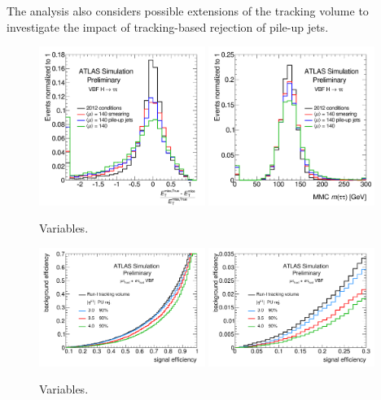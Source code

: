The analysis also considers possible extensions of the tracking volume to investigate the impact of tracking-based rejection of pile-up jets. 

\begin{figure}[!htpb]
  \centering
  \includegraphics[width=0.48\textwidth]{figures/ATL-PHYS-PUB-2014-018/fig_01a}
  \includegraphics[width=0.48\textwidth]{figures/ATL-PHYS-PUB-2014-018/fig_01b}
  \caption{Variables.}
  \label{fig:prospects-hllhc-degradation}
\end{figure}

\begin{figure}[!htpb]
  \centering
  \includegraphics[width=0.48\textwidth]{figures/ATL-PHYS-PUB-2014-018/fig_02a}
  \includegraphics[width=0.48\textwidth]{figures/ATL-PHYS-PUB-2014-018/fig_02b}
  \caption{Variables.}
  \label{fig:prospects-hllhc-rocs}
\end{figure}

